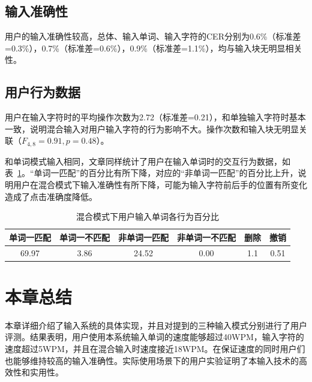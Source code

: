 \subsection{输入准确性}
用户的输入准确性较高，总体、输入单词、输入字符的CER分别为0.6\%（标准差=0.3\%），0.7\%（标准差=0.6\%），0.9\%（标准差=1.1\%），均与输入块无明显相关性。

\subsection{用户行为数据}
用户在输入字符时的平均操作次数为2.72（标准差=0.21），和单独输入字符时基本一致，说明混合输入对用户输入字符的行为影响不大。操作次数和输入块无明显关联（$F_{4,8}=0.91, p =0.48$）。

和单词模式输入相同，文章同样统计了用户在输入单词时的交互行为数据，如表~\ref{tab:hybrid-stat}。“单词一匹配”的百分比有所下降，对应的“非单词一匹配”的百分比上升，说明用户在混合模式下输入准确性有所下降，可能为输入字符前后手的位置有所变化造成了点击准确度降低。

\begin{table}[h]
  \centering
  \begin{minipage}[t]{0.9\linewidth} %
  \caption[混合模式下用户输入单词各行为百分比]{混合模式下用户输入单词各行为百分比}
  \label{tab:hybrid-stat}
    \centering
    \begin{tabularx}{\linewidth}{cccccc}
      \toprule[1.5pt]
      单词一匹配 & 单词一不匹配 & 非单词一匹配 & 非单词一不匹配 & 删除 & 撤销\\\midrule[1pt]
      69.97 & 3.86 & 24.52 & 0.00 & 1.1 & 0.51\\
      \bottomrule[1.5pt]
    \end{tabularx}
  \end{minipage}
\end{table}

\section{本章总结}
本章详细介绍了输入系统的具体实现，并且对提到的三种输入模式分别进行了用户评测。结果表明，用户使用本系统输入单词的速度能够超过40WPM，输入字符的速度超过5WPM，并且在混合输入时速度接近18WPM。在保证速度的同时用户们也能够维持较高的输入准确性。实际使用场景下的用户实验证明了本输入技术的高效性和实用性。

